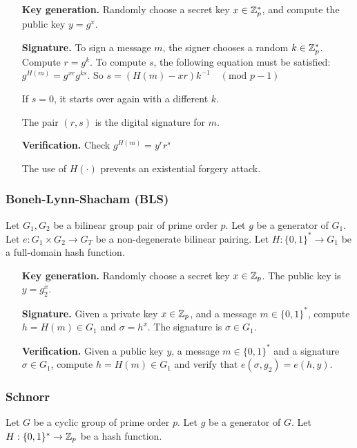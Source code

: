 \begin{itemize}[align = left, leftmargin=*]
	\item[\textbf{Key generation.}]	Randomly choose a secret key $x \in {\mathbb Z}_p^\ast$, and compute the public key $y = g^x$.
	
	\item[\textbf{Signature.}]To sign a message $m$, the signer chooses a random $k \in {\mathbb Z}_p^\ast$.
Compute $ r = g^k$. To compute $s$, the following equation must be satisfied: $g^{H(m)} = g^{xr} g^{ks}$.
So $s = \left( H(m) - xr \right) k^{-1} \quad (\text{mod } p-1)$

If $s=0$, it starts over again with a different $k$.

The pair $(r,s)$ is the digital signature for $m$.

	\item[\textbf{Verification.}]Check $g^{H(m)} = y^r r^s$

The use of $H( \cdot )$ prevents an existential forgery attack.

\end{itemize}

\subsubsection*{Boneh-Lynn-Shacham (BLS)}
\label{sec:bls}
\cite{BonehLS01}
Let $G_1,G_2$ be a bilinear group pair of prime order $p$. Let $g$ be a generator of $G_1$. Let $e:G_1 \times G_2 \rightarrow G_T$ be a non-degenerate bilinear pairing. Let $H: \{0,1\}^* \rightarrow G_1$ be a full-domain hash function.

\begin{itemize}[align = left, leftmargin=*]
	\item[\textbf{Key generation.}] Randomly choose a secret key $x \in {\mathbb Z}_p$. The public key is $y = g_2^x$.
	
	\item[\textbf{Signature.}] Given a private key $x \in {\mathbb Z}_p$, and a message $m \in \{0,1\}^*$, compute $h = H(m) \in G_1$ and $\sigma = h^x$. The signature is $\sigma \in G_1$.
	
	\item[\textbf{Verification.}] Given a public key $y$, a message $m \in \{0,1\}^*$ and a signature $\sigma \in G_1$, compute $h = H(m) \in G_1$ and verify that $e(\sigma,g_2) = e \left( h, y \right)$.
	
\end{itemize}

\subsubsection*{Schnorr}
\label{sec:schnorr}
\cite{Schnorr90}
Let $G$ be a cyclic group of prime order $p$. Let $g$ be a generator of $G$. Let $H : \{0,1\}^\ast \rightarrow {\mathbb Z}_p$ be a hash function.


